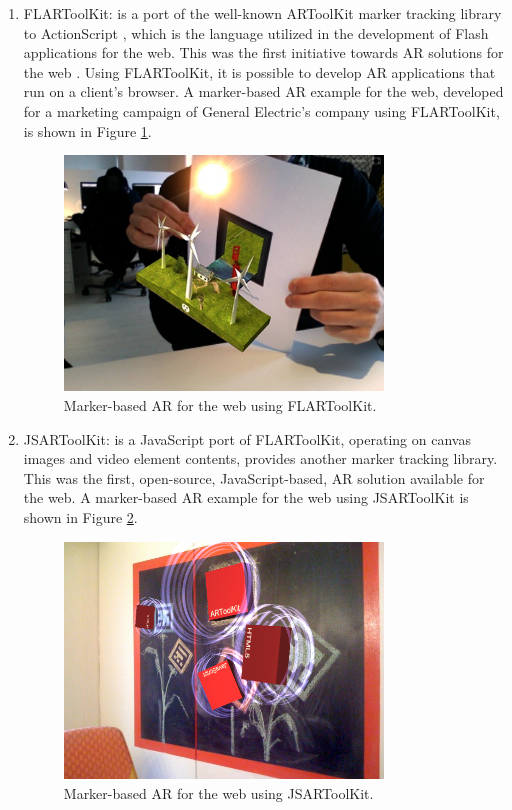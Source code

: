 \begin{enumerate}
    \item FLARToolKit: is a port of the well-known ARToolKit marker tracking library to ActionScript \cite{Flash2013}, which is the language utilized in the development of Flash applications for the web. This was the first initiative towards AR solutions for the web \cite{Pablo2013}. Using FLARToolKit, it is possible to develop AR applications that run on a client's browser. A marker-based AR example for the web, developed for a marketing campaign of General Electric's company using FLARToolKit, is shown in Figure \ref{figure:flartoolkit}.

    \begin{figure}[!htb]
      \centering
      \includegraphics[width=240pt]{chapters/tracking_library_for_the_web/flartoolkit.png}
      \caption{Marker-based AR for the web using FLARToolKit.}
      \label{figure:flartoolkit}
    \end{figure}

    \item JSARToolKit: is a JavaScript port of FLARToolKit, operating on canvas images and video element contents, provides another marker tracking library. This was the first, open-source, JavaScript-based, AR solution available for the web. A marker-based AR example for the web using JSARToolKit is shown in Figure \ref{figure:jsartoolkit}.

    \begin{figure}[!htb]
      \centering
      \includegraphics[width=240pt]{chapters/tracking_library_for_the_web/jsartoolkit.png}
      \caption{Marker-based AR for the web using JSARToolKit.}
      \label{figure:jsartoolkit}
    \end{figure}


\end{enumerate}
